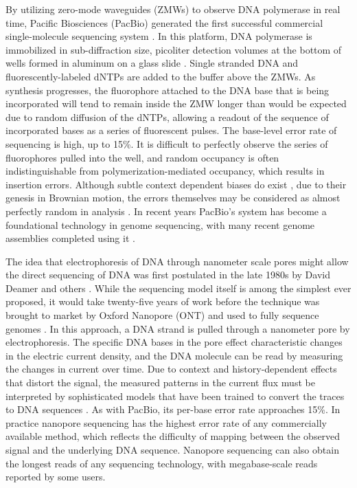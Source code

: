 \documentclass[a4paper,12pt,numbered,oneside]{Classes/PhDThesisPSnPDF}
\begin{document}
By utilizing zero-mode waveguides (ZMWs) to observe DNA polymerase in real time, Pacific Biosciences (PacBio) generated the first successful commercial single-molecule sequencing system \cite{eid2009real}.
In this platform, DNA polymerase is immobilized in sub-diffraction size, picoliter detection volumes at the bottom of wells formed in aluminum on a glass slide \cite{korlach2008selective}.
Single stranded DNA and fluorescently-labeled dNTPs are added to the buffer above the ZMWs.
As synthesis progresses, the fluorophore attached to the DNA base that is being incorporated will tend to remain inside the ZMW longer than would be expected due to random diffusion of the dNTPs, allowing a readout of the sequence of incorporated bases as a series of fluorescent pulses.
The base-level error rate of sequencing is high, up to 15\%.
It is difficult to perfectly observe the series of fluorophores pulled into the well, and random occupancy is often indistinguishable from polymerization-mediated occupancy, which results in insertion errors.
Although subtle context dependent biases do exist \cite{ono2012pbsim}, due to their genesis in Brownian motion, the errors themselves may be considered as almost perfectly random in analysis \cite{ross2013characterizing,myers2014efficient}.
In recent years PacBio's system has become a foundational technology in genome sequencing, with many recent genome assemblies completed using it \cite{rhoads2015pacbio}.

The idea that electrophoresis of DNA through nanometer scale pores might allow the direct sequencing of DNA was first postulated in the late 1980s by David Deamer and others \cite{deamer2016three}.
While the sequencing model itself is among the simplest ever proposed, it would take twenty-five years of work \cite{kasianowicz1996characterization,purnell2008nucleotide} before the technique was brought to market by Oxford Nanopore (ONT) \cite{mikheyev2014first} and used to fully sequence genomes \cite{loman2015complete, jain2018nanopore}.
In this approach, a DNA strand is pulled through a nanometer pore by electrophoresis.
The specific DNA bases in the pore effect characteristic changes in the electric current density, and the DNA molecule can be read by measuring the changes in current over time.
Due to context and history-dependent effects that distort the signal, the measured patterns in the current flux must be interpreted by sophisticated models that have been trained to convert the traces to DNA sequences \cite{david2016nanocall}.
As with PacBio, its per-base error rate approaches 15\%.
In practice nanopore sequencing has the highest error rate of any commercially available method, which reflects the difficulty of mapping between the observed signal and the underlying DNA sequence.
Nanopore sequencing can also obtain the longest reads of any sequencing technology, with megabase-scale reads reported by some users.
\end{document}
